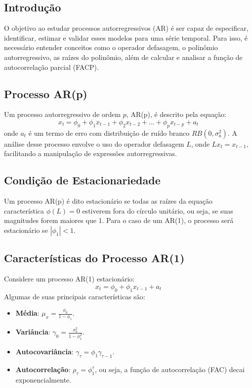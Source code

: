 \documentclass{sciposter}
\begin{document}
\begin{multicols}{3}
\subsection{Introdução}
O objetivo ao estudar processos autorregressivos (AR) é ser capaz de especificar, identificar, estimar e validar esses modelos para uma série temporal. Para isso, é necessário entender conceitos como o operador defasagem, o polinômio autorregressivo, as raízes do polinômio, além de calcular e analisar a função de autocorrelação parcial (FACP).

\subsection{Processo AR(p)}
Um processo autorregressivo de ordem $p$, AR(p), é descrito pela equação:
\[
x_t = \phi_0 + \phi_1 x_{t-1} + \phi_2 x_{t-2} + \dots + \phi_p x_{t-p} + a_t
\]
onde $a_t$ é um termo de erro com distribuição de ruído branco $RB(0, \sigma_a^2)$. A análise desse processo envolve o uso do operador defasagem $L$, onde $L x_t = x_{t-1}$, facilitando a manipulação de expressões autorregressivas.

\subsection{Condição de Estacionariedade}
Um processo AR(p) é dito estacionário se todas as raízes da equação característica $\phi(L) = 0$ estiverem fora do círculo unitário, ou seja, se suas magnitudes forem maiores que 1. Para o caso de um AR(1), o processo será estacionário se $|\phi_1| < 1$.

\subsection{Características do Processo AR(1)}
Considere um processo AR(1) estacionário:
\[
x_t = \phi_0 + \phi_1 x_{t-1} + a_t
\]
Algumas de suas principais características são:
\begin{itemize}
    \item \textbf{Média}: $\mu_x = \frac{\phi_0}{1 - \phi_1}$.
    \item \textbf{Variância}: $\gamma_0 = \frac{\sigma_a^2}{1 - \phi_1^2}$.
    \item \textbf{Autocovariância}: $\gamma_\tau = \phi_1 \gamma_{\tau-1}$.
    \item \textbf{Autocorrelação}: $\rho_\tau = \phi_1^\tau$, ou seja, a função de autocorrelação (FAC) decai exponencialmente.
\end{itemize}


\end{multicols}
\end{document}
